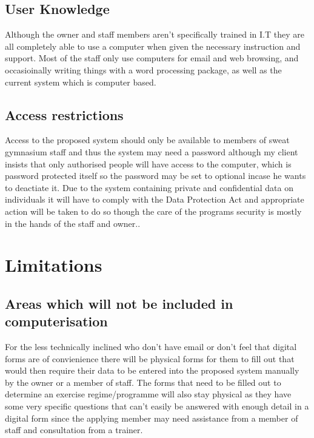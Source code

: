 \subsection{User Knowledge}

Although the owner and staff members aren't specifically trained in I.T they are all completely able to use a computer when given the necessary instruction and support. Most of the staff only use computers for email and web browsing, and occasioinally writing things with a word processing package, as well as the current system which is computer based.

\subsection{Access restrictions}

Access to the proposed system should only be available to members of sweat gymnasium staff and thus the system may need a password although my client insists that only authorised people will have access to the computer, which is password protected itself so the password may be set to optional incase he wants to deactiate it. Due to the system containing private and confidential data on individuals it will have to comply with the Data Protection Act and appropriate action will be taken to do so though the care of the programs security is mostly in the hands of the staff and owner..

\section{Limitations}

\subsection{Areas which will not be included in computerisation}

For the less technically inclined who don't have email or don't feel that digital forms are of convienience there will be physical forms for them to fill out that would then require their data to be entered into the proposed system manually by the owner or a member of staff. The forms that need to be filled out to determine an exercise regime/programme will also stay physical as they have some very specific questions that can't easily be answered with enough detail in a digital form since the applying member may need assistance from a member of staff and consultation from a trainer. 

